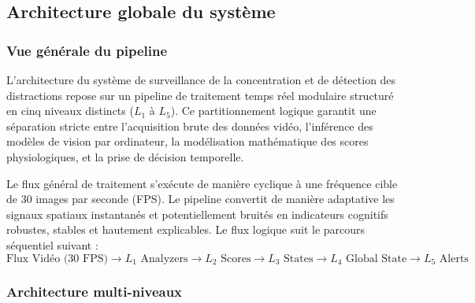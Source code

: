 \subsection{Architecture globale du système}

\subsubsection{Vue générale du pipeline}

L'architecture du système de surveillance de la concentration et de détection des distractions repose sur un pipeline de traitement temps réel modulaire structuré en cinq niveaux distincts ($L_1$ à $L_5$). Ce partitionnement logique garantit une séparation stricte entre l'acquisition brute des données vidéo, l'inférence des modèles de vision par ordinateur, la modélisation mathématique des scores physiologiques, et la prise de décision temporelle.

Le flux général de traitement s'exécute de manière cyclique à une fréquence cible de 30 images par seconde (FPS). Le pipeline convertit de manière adaptative les signaux spatiaux instantanés et potentiellement bruités en indicateurs cognitifs robustes, stables et hautement explicables. Le flux logique suit le parcours séquentiel suivant :
\begin{equation}
\text{Flux Vidéo (30 FPS)} \longrightarrow L_1 \text{ Analyzers} \longrightarrow L_2 \text{ Scores} \longrightarrow L_3 \text{ States} \longrightarrow L_4 \text{ Global State} \longrightarrow L_5 \text{ Alerts}
\end{equation}

\subsubsection{Architecture multi-niveaux}

